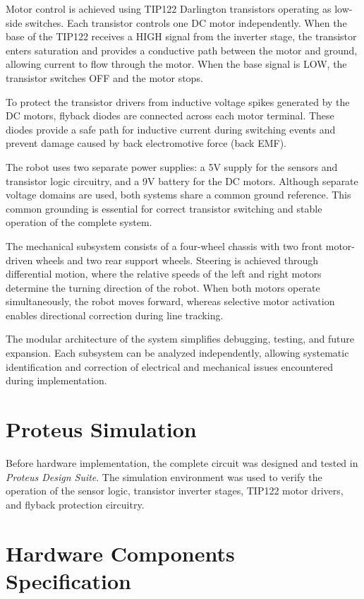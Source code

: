 \documentclass[conference]{IEEEtran}
\begin{document}
Motor control is achieved using TIP122 Darlington transistors operating as low-side switches. Each transistor controls one DC motor independently. When the base of the TIP122 receives a HIGH signal from the inverter stage, the transistor enters saturation and provides a conductive path between the motor and ground, allowing current to flow through the motor. When the base signal is LOW, the transistor switches OFF and the motor stops.

To protect the transistor drivers from inductive voltage spikes generated by the DC motors, flyback diodes are connected across each motor terminal. These diodes provide a safe path for inductive current during switching events and prevent damage caused by back electromotive force (back EMF).

The robot uses two separate power supplies: a 5V supply for the sensors and transistor logic circuitry, and a 9V battery for the DC motors. Although separate voltage domains are used, both systems share a common ground reference. This common grounding is essential for correct transistor switching and stable operation of the complete system.

The mechanical subsystem consists of a four-wheel chassis with two front motor-driven wheels and two rear support wheels. Steering is achieved through differential motion, where the relative speeds of the left and right motors determine the turning direction of the robot. When both motors operate simultaneously, the robot moves forward, whereas selective motor activation enables directional correction during line tracking.

The modular architecture of the system simplifies debugging, testing, and future expansion. Each subsystem can be analyzed independently, allowing systematic identification and correction of electrical and mechanical issues encountered during implementation.

\section{Proteus Simulation}


Before hardware implementation, the complete circuit was designed and tested in \textit{Proteus Design Suite}. The simulation environment was used to verify the operation of the sensor logic, transistor inverter stages, TIP122 motor drivers, and flyback protection circuitry. 

\section{Hardware Components Specification}
\end{document}
